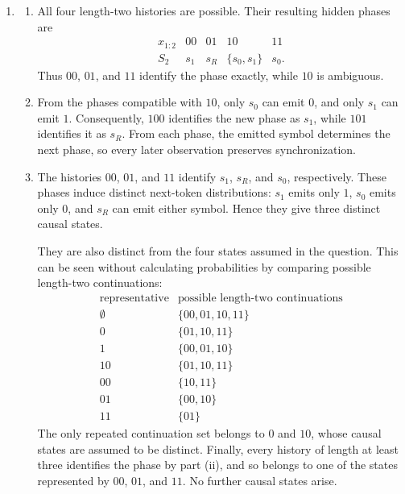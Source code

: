 \begin{solution}[ex:p2-3]
    \begin{enumerate}
      \item
        \begin{enumerate}
          \item All four length-two histories are possible. Their resulting
            hidden phases are
            \[
              \begin{array}{c|cccc}
                x_{1:2} & 00 & 01 & 10 & 11\\
                \hline
                S_2 & s_1 & s_R & \{s_0,s_1\} & s_0.
              \end{array}
            \]
            Thus $00$, $01$, and $11$ identify the phase exactly, while $10$
            is ambiguous.

          \item From the phases compatible with $10$, only $s_0$ can emit
            $0$, and only $s_1$ can emit $1$. Consequently, $100$ identifies
            the new phase as $s_1$, while $101$ identifies it as $s_R$. From
            each phase, the emitted symbol determines the next phase, so every
            later observation preserves synchronization.

          \item The histories $00$, $01$, and $11$ identify $s_1$, $s_R$,
            and $s_0$, respectively. These phases induce distinct next-token
            distributions: $s_1$ emits only $1$, $s_0$ emits only $0$, and
            $s_R$ can emit either symbol. Hence they give three distinct causal
            states.

            They are also distinct from the four states assumed in the
            question. This can be seen without calculating probabilities by
            comparing possible length-two continuations:
            \[
              \begin{array}{c|c}
                \text{representative} & \text{possible length-two continuations}\\
                \hline
                \emptyset & \{00,01,10,11\}\\
                0          & \{01,10,11\}\\
                1          & \{00,01,10\}\\
                10         & \{01,10,11\}\\
                00         & \{10,11\}\\
                01         & \{00,10\}\\
                11         & \{01\}
              \end{array}
            \]
            The only repeated continuation set belongs to $0$ and $10$, whose
            causal states are assumed to be distinct. Finally, every history
            of length at least three identifies the phase by part (ii), and so
            belongs to one of the states represented by $00$, $01$, and $11$.
            No further causal states arise.


\end{enumerate}
\end{enumerate}
\end{solution}
